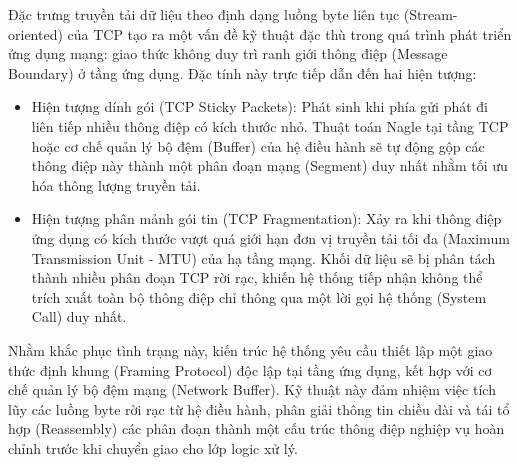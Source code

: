 Đặc trưng truyền tải dữ liệu theo định dạng luồng byte liên tục (Stream-oriented) của TCP tạo ra một vấn đề kỹ thuật đặc thù trong quá trình phát triển ứng dụng mạng: giao thức không duy trì ranh giới thông điệp (Message Boundary) ở tầng ứng dụng. Đặc tính này trực tiếp dẫn đến hai hiện tượng:
\begin{itemize}[label={-}]
    \item Hiện tượng dính gói (TCP Sticky Packets): Phát sinh khi phía gửi phát đi liên tiếp nhiều thông điệp có kích thước nhỏ. Thuật toán Nagle tại tầng TCP hoặc cơ chế quản lý bộ đệm (Buffer) của hệ điều hành sẽ tự động gộp các thông điệp này thành một phân đoạn mạng (Segment) duy nhất nhằm tối ưu hóa thông lượng truyền tải.
    \item Hiện tượng phân mảnh gói tin (TCP Fragmentation): Xảy ra khi thông điệp ứng dụng có kích thước vượt quá giới hạn đơn vị truyền tải tối đa (Maximum Transmission Unit - MTU) của hạ tầng mạng. Khối dữ liệu sẽ bị phân tách thành nhiều phân đoạn TCP rời rạc, khiến hệ thống tiếp nhận không thể trích xuất toàn bộ thông điệp chỉ thông qua một lời gọi hệ thống (System Call) duy nhất.
\end{itemize}

Nhằm khắc phục tình trạng này, kiến trúc hệ thống yêu cầu thiết lập một giao thức định khung (Framing Protocol) độc lập tại tầng ứng dụng, kết hợp với cơ chế quản lý bộ đệm mạng (Network Buffer). Kỹ thuật này đảm nhiệm việc tích lũy các luồng byte rời rạc từ hệ điều hành, phân giải thông tin chiều dài và tái tổ hợp (Reassembly) các phân đoạn thành một cấu trúc thông điệp nghiệp vụ hoàn chỉnh trước khi chuyển giao cho lớp logic xử lý.
